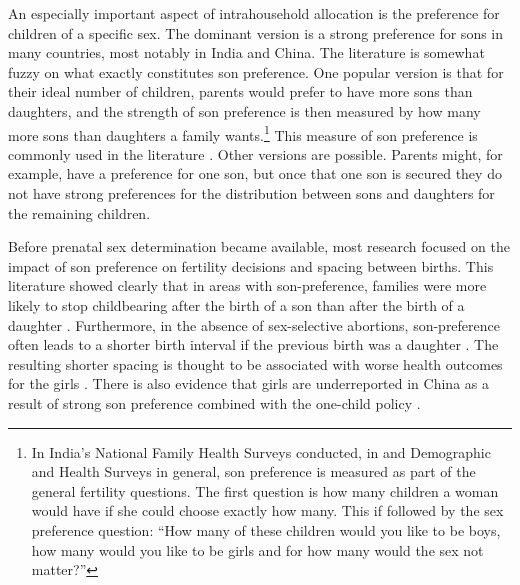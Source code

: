 An especially important aspect of intrahousehold allocation is the preference for children of a specific sex. The dominant version is a strong preference for sons in many countries, most notably in India and China. The literature is somewhat fuzzy on what exactly constitutes son preference. One popular version is that for their ideal number of children, parents would prefer to have more sons than daughters, and the strength of son preference is then measured by how many more sons than daughters a family wants.\footnote{In India's National Family Health Surveys conducted, in and Demographic and Health Surveys in general, son preference is measured as part of the general fertility questions. The first question is how many children a woman would have if she could choose exactly how many. This if followed by the sex preference question: ``How many of these children would you like to be boys, how many would you like to be girls and for how many would the sex not matter?''} This measure of son preference is commonly used in the literature \citep[e.g.]{clark00,Jensen2009,Hu2015}. Other versions are possible. Parents might, for example, have a preference for one son, but once that one son is secured they do not have strong preferences for the distribution between sons and daughters for the remaining children.

Before prenatal sex determination became available, most research focused on the impact of son preference on fertility decisions and spacing between births. This literature showed clearly that in areas with son-preference, families were more likely to stop childbearing after the birth of a son than after the birth of a daughter \citep[see, for
example,][]{Das1987,Arnold1997,clark00,filmer09}. Furthermore, in the absence of sex-selective abortions, son-preference often leads to a shorter birth interval if the previous birth was a daughter \citep[see, for
example,][]{Das1987,Rahman1993,Pong1994,Haughton1996,Arnold1997}. The resulting shorter spacing is thought to be associated with worse health outcomes for the girls \citep{arnold98,Whitworth2002,Rutstein2005,Conde-Agudelo2006}. There is also evidence that girls are underreported in China as a result of strong son preference combined with the one-child policy \citep{Merli2000}.

